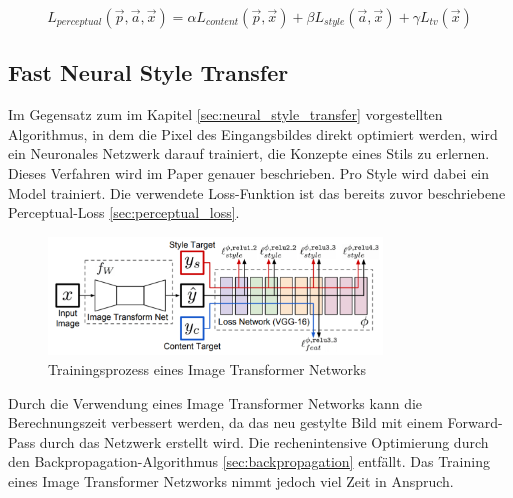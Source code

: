 \begin{equation}
	\label{eq:perceptual_loss}
    L_{perceptual} ( \vec{p}, \vec{a}, \vec{x} ) = \alpha L_{content} ( \vec{p}, \vec{x} ) + \beta L_{style} ( \vec{a}, \vec{x} ) + \gamma L_{tv} ( \vec{x} )
\end{equation}

\subsection{Fast Neural Style Transfer}
\label{sec:fast_neural_style_transfer}

Im Gegensatz zum im Kapitel \ref{sec:neural_style_transfer} vorgestellten Algorithmus, in dem die Pixel des Eingangsbildes direkt optimiert werden, wird ein
Neuronales Netzwerk darauf trainiert, die Konzepte eines Stils zu erlernen. Dieses Verfahren wird im Paper \cite{DBLP:journals/corr/JohnsonAL16} genauer beschrieben. Pro Style wird dabei ein Model trainiert. Die verwendete Loss-Funktion ist das bereits zuvor beschriebene Perceptual-Loss \ref{sec:perceptual_loss}.

\begin{figure}[H]
	\centering
	\includegraphics[width=0.79\textwidth]{resources/content/fast_neural_style.png}
	\caption{Trainingsprozess eines Image Transformer Networks \cite{DBLP:journals/corr/JohnsonAL16}}
	\label{img:fast_neural_style_transfer}
\end{figure}

Durch die Verwendung eines Image Transformer Networks kann die Berechnungszeit verbessert werden, da das neu gestylte Bild mit einem Forward-Pass durch das Netzwerk erstellt wird. Die rechenintensive Optimierung durch den Backpropagation-Algorithmus \ref{sec:backpropagation} entfällt. Das Training eines Image Transformer Netzworks nimmt jedoch viel Zeit in Anspruch.